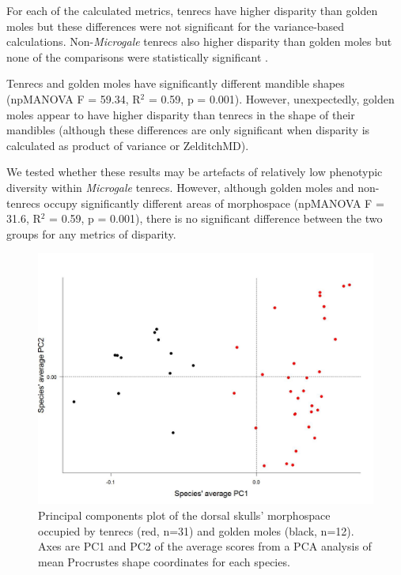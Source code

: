 \documentclass[12pt,a4paper]{article}
\begin{document}
	For each of the calculated metrics, tenrecs have higher disparity than golden moles but these differences were not significant for the variance-based calculations.  
	Non-\textit{Microgale} tenrecs also higher disparity than golden moles but none of the comparisons were statistically significant .

	Tenrecs and golden moles have significantly different mandible shapes (npMANOVA F = 59.34, R$^2$ = 0.59, p = 0.001). However, unexpectedly, golden moles appear to have higher disparity than tenrecs in the shape of their mandibles (although these differences are only significant when disparity is calculated as product of variance or ZelditchMD). 

	We tested whether these results may be artefacts of relatively low phenotypic diversity within \textit{Microgale} tenrecs. However, although golden moles and non- tenrecs occupy significantly different areas of morphospace (npMANOVA F = 31.6, R$^2$ = 0.59, p =	0.001), there is no significant difference between the two groups for any metrics of disparity. %


	
	\begin{figure}[H]
	\centering
	\includegraphics[width=1\linewidth]{figures/SkDors_Tenrecs+Gmoles_PC1PC2_01_05.jpg}
	\caption{Principal components plot of the dorsal skulls' morphospace occupied by tenrecs (red, n=31) and golden moles (black, n=12). Axes are PC1 and PC2 of the average scores from a PCA analysis of mean Procrustes shape coordinates for each species. }
	\label{fig:skdorsPCA}
	\end{figure}
\end{document}
